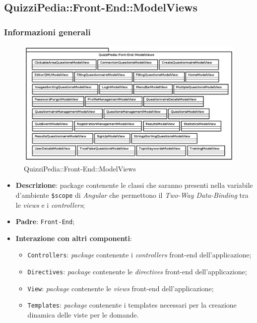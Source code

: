 \newpage

\subsection{QuizziPedia::Front-End::ModelViews}
\subsubsection{Informazioni generali}
\label{QuizziPedia::Front-End::ModelViews}
\begin{figure} [ht]
	\centering
	\includegraphics[scale=0.45]{UML/Package/QuizziPedia_Front-End_ModelViews.png}
	\caption{QuizziPedia::Front-End::ModelViews}
\end{figure} \FloatBarrier
\begin{itemize}
	\item \textbf{Descrizione}: package contenente le classi che saranno presenti nella variabile d'ambiente \texttt{\$scope} di \textit{Angular} che permettono il \textit{Two-Way Data-Binding} tra le \textit{views} e i \textit{controllers};
	\item \textbf{Padre}: \texttt{Front-End};
	\item \textbf{Interazione con altri componenti}:
	\begin{itemize}
		\item \texttt{Controllers}: \textit{package} contenente i \textit{controllers} front-end dell'applicazione;
		\item \texttt{Directives}: \textit{package} contenente le \textit{directives} front-end dell'applicazione;
		\item \texttt{View}: \textit{package} contenente le \textit{views} front-end dell'applicazione;
		\item \texttt{Templates}: \textit{package} contenente i templates necessari per la creazione dinamica delle viste per le domande.
	\end{itemize}
\end{itemize}
